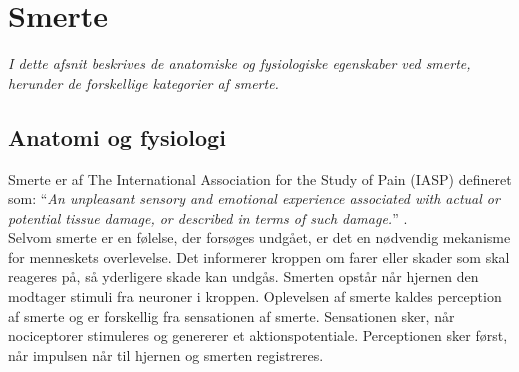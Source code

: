 \section{Smerte}
\textit{I dette afsnit beskrives de anatomiske og fysiologiske egenskaber ved smerte, herunder de forskellige kategorier af smerte.}

\subsection{Anatomi og fysiologi}
Smerte er af The International Association for the Study of Pain (IASP) defineret som: “\textit{An unpleasant sensory and emotional experience associated with actual or potential tissue damage, or described in terms of such damage.}” \citep{Carmon}.\\
Selvom smerte er en følelse, der forsøges undgået, er det en nødvendig mekanisme for menneskets overlevelse. Det informerer kroppen om farer eller skader som skal reageres på, så yderligere skade kan undgås.
Smerten opstår når hjernen den modtager stimuli fra neuroner i kroppen. Oplevelsen af smerte kaldes perception af smerte og er forskellig fra sensationen af smerte. Sensationen sker, når nociceptorer stimuleres og genererer et aktionspotentiale. Perceptionen sker først, når impulsen når til hjernen og smerten registreres. \citep{Martini2012}

